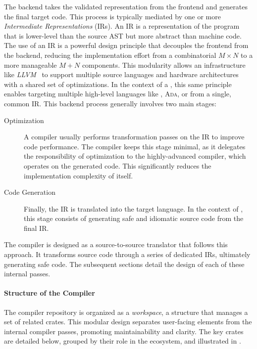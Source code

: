 The backend takes the validated representation from the frontend and generates the final target
code. This process is typically mediated by one or more \emph{Intermediate Representations} (IRs).
An IR is a representation of the program that is lower-level than the source AST but more abstract
than machine code.
%
The use of an IR is a powerful design principle that decouples the frontend from the backend,
reducing the implementation effort from a combinatorial \(M \times N\) to a more manageable
\(M + N\) components. This modularity allows an infrastructure like
\emph{LLVM}~\cite{DBLP:conf/cgo/LattnerA04} to support multiple source languages and hardware
architectures with a shared set of optimizations. In the context of a \dsl, this same
principle enables targeting multiple high-level languages like \Ci, \textsc{Ada}, or \Rust
from a single, common IR.
%
This backend process generally involves two main stages:
\begin{description}
    \item[Optimization] A compiler usually performs transformation passes on the IR to improve
          code performance. The \GRust compiler keeps this stage minimal, as it delegates the
          responsibility of optimization to the highly-advanced \Rust compiler, which operates
          on the generated code. This significantly reduces the implementation complexity of \GRust
          itself.

    \item[Code Generation] Finally, the IR is translated into the target language. In the
          context of \GRust, this stage consists of generating safe and idiomatic \Rust
          source code from the final IR.
\end{description}

The \GRust compiler is designed as a source-to-source translator that follows this approach. It
transforms \GRust source code through a series of dedicated IRs, ultimately generating safe \Rust
code. The subsequent sections detail the design of each of these internal passes.

\paragraph{Structure of the \GRust Compiler}

The \GRust compiler repository is organized as a \Rust \emph{workspace}, a structure that manages a
set of related crates. This modular design separates user-facing elements from the internal compiler
passes, promoting maintainability and clarity. The key crates are detailed below, grouped by their
role in the ecosystem, and illustrated in .


